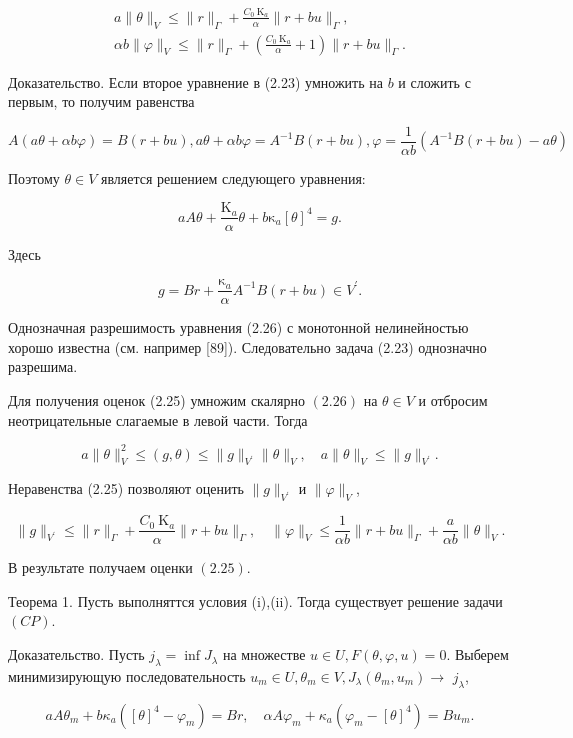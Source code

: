 \documentclass[10pt]{article}
\begin{document}
$$
\begin{array}{r}
a\|\theta\|_{V} \leqslant\|r\|_{\Gamma}+\frac{C_{0} \mathrm{~K}_{a}}{\alpha}\|r+b u\|_{\Gamma}, \\
\alpha b\|\varphi\|_{V} \leqslant\|r\|_{\Gamma}+\left(\frac{C_{0} \mathrm{~K}_{a}}{\alpha}+1\right)\|r+b u\|_{\Gamma} .
\end{array}
$$

Доказательство. Если второе уравнение в (2.23) умножить на $b$ и сложить с первым, то получим равенства

$$
A(a \theta+\alpha b \varphi)=B(r+b u), a \theta+\alpha b \varphi=A^{-1} B(r+b u), \varphi=\frac{1}{\alpha b}\left(A^{-1} B(r+b u)-a \theta\right)
$$

Поэтому $\theta \in V$ является решением следующего уравнения:

$$
a A \theta+\frac{\mathrm{K}_{a}}{\alpha} \theta+b \mathrm{\kappa}_{a}[\theta]^{4}=g .
$$

Здесь

$$
g=B r+\frac{\mathrm{\kappa}_{a}}{\alpha} A^{-1} B(r+b u) \in V^{\prime} .
$$

Однозначная разрешимость уравнения (2.26) с монотонной нелинейностью хорошо известна (см. например [89]). Следовательно задача (2.23) однозначно разрешима.

Для получения оценок (2.25) умножим скалярно $(2.26)$ на $\theta \in V$ и отбросим неотрицательные слагаемые в левой части. Тогда

$$
a\|\theta\|_{V}^{2} \leqslant(g, \theta) \leqslant\|g\|_{V^{\prime}}\|\theta\|_{V}, \quad a\|\theta\|_{V} \leqslant\|g\|_{V^{\prime}} .
$$

Неравенства (2.25) позволяют оценить $\|g\|_{V^{\prime}}$ и $\|\varphi\|_{V}$,

$$
\|g\|_{V^{\prime}} \leqslant\|r\|_{\Gamma}+\frac{C_{0} \mathrm{~K}_{a}}{\alpha}\|r+b u\|_{\Gamma}, \quad\|\varphi\|_{V} \leqslant \frac{1}{\alpha b}\|r+b u\|_{\Gamma}+\frac{a}{\alpha b}\|\theta\|_{V} .
$$

В результате получаем оценки $(2.25)$.

Теорема 1. Пусть выполняттся условия (i),(ii). Тогда существует решение задачи $(C P)$.

Доказательство. Пусть $j_{\lambda}=\inf J_{\lambda}$ на множестве $u \in U, F(\theta, \varphi, u)=0$. Выберем минимизирующую последовательность $u_{m} \in U, \theta_{m} \in V, J_{\lambda}\left(\theta_{m}, u_{m}\right) \rightarrow$ $j_{\lambda}$,

$$
a A \theta_{m}+b \kappa_{a}\left([\theta]^{4}-\varphi_{m}\right)=B r, \quad \alpha A \varphi_{m}+\kappa_{a}\left(\varphi_{m}-[\theta]^{4}\right)=B u_{m} .
$$
\end{document}
